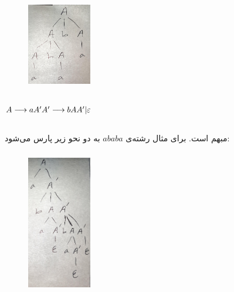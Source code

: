 \documentclass{article}
\begin{document}
\subsubsection{}
\begin{figure}[H]
    \centering
    \includegraphics[width=0.25\textwidth]{figures/c6.jpg}
    \caption
	{}
    \label{fig:fig1}
\end{figure}




\subsection{}
\begin{latin}
$
A \longrightarrow a A ^ \prime \\
A ^ \prime \longrightarrow b A A ^ \prime | \varepsilon
$
\end{latin}


\subsection{}
مبهم است. برای مثال رشته‌ی $a b a b a$ به دو نحو زیر پارس می‌شود:
\subsubsection{}
\begin{figure}[H]
    \centering
    \includegraphics[width=0.25\textwidth]{figures/c3.jpg}
    \caption
	{}
    \label{fig:fig1}
\end{figure}
\end{document}
